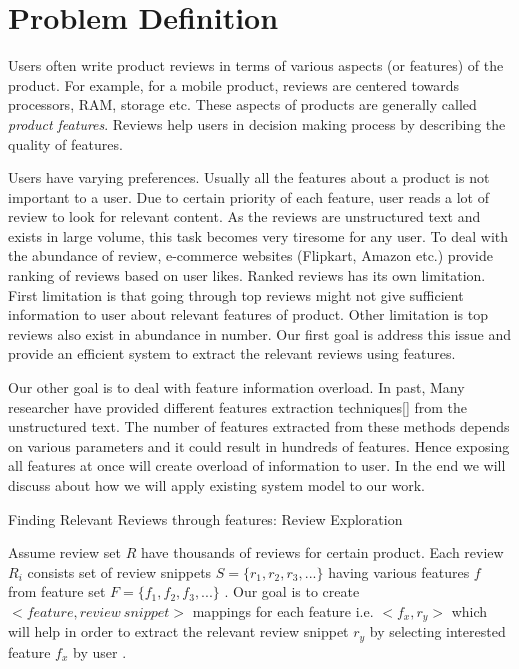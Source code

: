 \section{Problem Definition}\label{sec:problem-definition}
Users often write product reviews in terms of various aspects (or features) 
of the product. For example, for a mobile product, reviews are centered towards 
processors, RAM, storage etc. These aspects of products are generally called 
{\em product features}. Reviews help users in decision making process by 
describing the quality of features. 

Users have varying preferences. Usually all the features about a product 
is not important to a user. Due to certain priority of each feature, user 
reads a lot of review to look for relevant content. As the reviews are 
unstructured text and exists in large volume, this task becomes very tiresome 
for any user. To deal with the abundance of review, e-commerce websites 
(Flipkart, Amazon etc.) provide ranking of reviews based on user likes.  
Ranked reviews has its own limitation. First limitation is that going 
through top reviews might not give sufficient information to user about 
relevant features of product. Other limitation is top reviews also exist 
in abundance in number. Our first goal is address this issue and provide 
an efficient system to extract the relevant reviews using features.

Our other goal is to deal with feature information overload. In past, Many researcher have provided different features extraction techniques[] from the unstructured text. The number of features extracted from these methods depends on various parameters and it could result in hundreds of features. Hence exposing all features at once will create overload of information to user. In the end we will discuss about how we will apply existing system model to our work.


\begin{problem}
	Finding Relevant Reviews through features: Review Exploration
\end{problem}
Assume review set $ R $ have thousands of reviews for certain product. Each review $R_{i}$ consists set of review snippets $S = \{ r_{1}, r_{2}, r_{3},... \}$ having various features $f$ from feature set $F = \{f_{1}, f_{2}, f_{3},... \}$ . Our goal is to create $<feature,review\ snippet>$ mappings for each feature i.e. $<f_{x},r_{y}>$ which will help in order to extract the relevant review snippet $r_{y}$ by selecting interested feature $f_{x}$ by user . 

